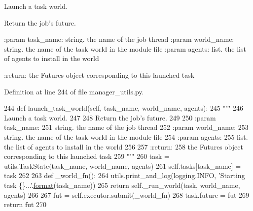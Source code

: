 \begin{DoxyVerb}Launch a task world.

Return the job's future.

:param task_name:
    string. the name of the job thread
:param world_name:
    string. the name of the task world in the module file
:param agents:
    list. the list of agents to install in the world

:return:
    the Futures object corresponding to this launched task
\end{DoxyVerb}
 

Definition at line 244 of file manager\+\_\+utils.\+py.


\begin{DoxyCode}
244     \textcolor{keyword}{def }launch\_task\_world(self, task\_name, world\_name, agents):
245         \textcolor{stringliteral}{"""}
246 \textcolor{stringliteral}{        Launch a task world.}
247 \textcolor{stringliteral}{}
248 \textcolor{stringliteral}{        Return the job's future.}
249 \textcolor{stringliteral}{}
250 \textcolor{stringliteral}{        :param task\_name:}
251 \textcolor{stringliteral}{            string. the name of the job thread}
252 \textcolor{stringliteral}{        :param world\_name:}
253 \textcolor{stringliteral}{            string. the name of the task world in the module file}
254 \textcolor{stringliteral}{        :param agents:}
255 \textcolor{stringliteral}{            list. the list of agents to install in the world}
256 \textcolor{stringliteral}{}
257 \textcolor{stringliteral}{        :return:}
258 \textcolor{stringliteral}{            the Futures object corresponding to this launched task}
259 \textcolor{stringliteral}{        """}
260         task = utils.TaskState(task\_name, world\_name, agents)
261         self.tasks[task\_name] = task
262 
263         \textcolor{keyword}{def }\_world\_fn():
264             utils.print\_and\_log(logging.INFO, \textcolor{stringliteral}{'Starting task \{\}...'}.\hyperlink{namespaceparlai_1_1chat__service_1_1services_1_1messenger_1_1shared__utils_a32e2e2022b824fbaf80c747160b52a76}{format}(task\_name))
265             \textcolor{keywordflow}{return} self.\_run\_world(task, world\_name, agents)
266 
267         fut = self.executor.submit(\_world\_fn)
268         task.future = fut
269         \textcolor{keywordflow}{return} fut
270 
\end{DoxyCode}
\mbox{\label{classparlai_1_1chat__service_1_1core_1_1manager__utils_1_1ChatServiceWorldRunner_a5bf689cb8ff9889da98990ad770fd9a3}} 
